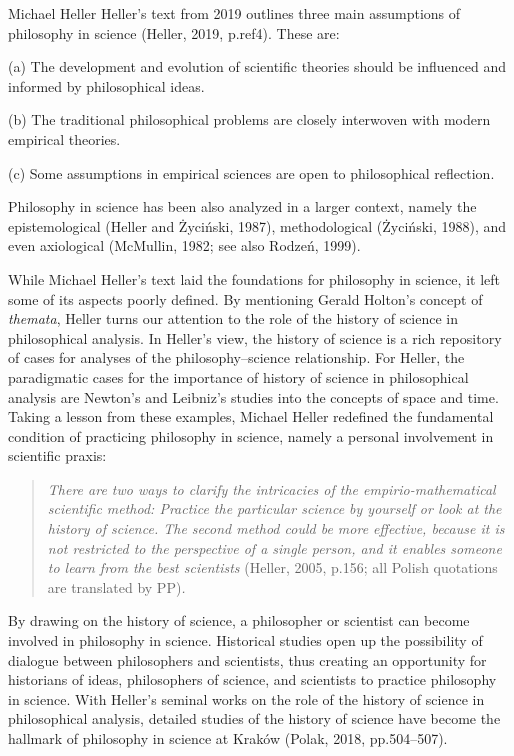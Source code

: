 \begin{artengenv}{Michael Heller}
Heller’s text from 2019 outlines three main assumptions of philosophy in science (Heller, 2019, p.ref4). These are:

(a) The development and evolution of scientific theories should be influenced and informed by philosophical ideas.

(b) The traditional philosophical problems are closely interwoven with modern empirical theories.

(c) Some assumptions in empirical sciences are open to philosophical reflection.

Philosophy in science has been also analyzed in a larger context, namely the epistemological (Heller and Życiński,
1987), methodological (Życiński, 1988), and even axiological (McMullin, 1982; see also Rodzeń, 1999). 

While Michael Heller’s text laid the foundations for philosophy in science, it left some of its aspects poorly defined.
By mentioning Gerald Holton’s concept of \textit{themata}, Heller turns our attention to the role of the history of
science in philosophical analysis. In Heller’s view, the history of science is a rich repository of cases for analyses
of the philosophy–science relationship. For Heller, the paradigmatic cases for the importance of history of science in
philosophical analysis are Newton’s and Leibniz’s studies into the concepts of space and time. Taking a lesson from
these examples, Michael Heller redefined the fundamental condition of practicing philosophy in science, namely a
personal involvement in scientific praxis:

\begin{quotation}
\textit{There are two ways to clarify the intricacies of the empirio-mathematical scientific method: Practice the
particular science by yourself or look at the history of science. The second method could be more effective, because it
is not restricted to the perspective of a single person, and it enables someone to learn from the best scientists
}(Heller, 2005, p.156; all Polish quotations are translated by PP)\textit{.}

\end{quotation}
By drawing on the history of science, a philosopher or scientist can become involved in philosophy in science.
Historical studies open up the possibility of dialogue between philosophers and scientists, thus creating an
opportunity for historians of ideas, philosophers of science, and scientists to practice philosophy in science. With
Heller’s seminal works on the role of the history of science in philosophical analysis, detailed studies of the history
of science have become the hallmark of philosophy in science at Kraków (Polak, 2018, pp.504–507).


\end{artengenv}

